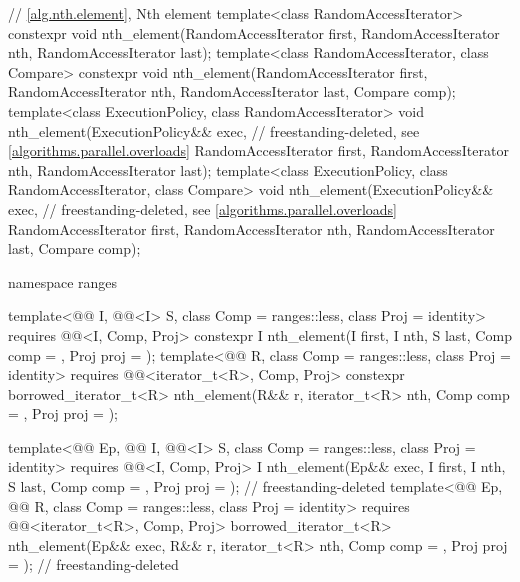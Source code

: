 \begin{codeblock}
{  // \ref{alg.nth.element}, Nth element
  template<class RandomAccessIterator>
    constexpr void nth_element(RandomAccessIterator first, RandomAccessIterator nth,
                               RandomAccessIterator last);
  template<class RandomAccessIterator, class Compare>
    constexpr void nth_element(RandomAccessIterator first, RandomAccessIterator nth,
                               RandomAccessIterator last, Compare comp);
  template<class ExecutionPolicy, class RandomAccessIterator>
    void nth_element(ExecutionPolicy&& exec,                    // freestanding-deleted, see \ref{algorithms.parallel.overloads}
                     RandomAccessIterator first, RandomAccessIterator nth,
                     RandomAccessIterator last);
  template<class ExecutionPolicy, class RandomAccessIterator, class Compare>
    void nth_element(ExecutionPolicy&& exec,                    // freestanding-deleted, see \ref{algorithms.parallel.overloads}
                     RandomAccessIterator first, RandomAccessIterator nth,
                     RandomAccessIterator last, Compare comp);

  namespace ranges {
    template<@@ I, @@<I> S, class Comp = ranges::less,
             class Proj = identity>
      requires @@<I, Comp, Proj>
      constexpr I
        nth_element(I first, I nth, S last, Comp comp = {}, Proj proj = {});
    template<@@ R, class Comp = ranges::less, class Proj = identity>
      requires @@<iterator_t<R>, Comp, Proj>
      constexpr borrowed_iterator_t<R>
        nth_element(R&& r, iterator_t<R> nth, Comp comp = {}, Proj proj = {});

    template<@@ Ep, @@ I, @@<I> S,
             class Comp = ranges::less, class Proj = identity>
      requires @@<I, Comp, Proj>
      I nth_element(Ep&& exec, I first, I nth, S last, Comp comp = {},
                    Proj proj = {});                            // freestanding-deleted
    template<@@ Ep, @@ R, class Comp = ranges::less,
             class Proj = identity>
      requires @@<iterator_t<R>, Comp, Proj>
      borrowed_iterator_t<R>
        nth_element(Ep&& exec, R&& r, iterator_t<R> nth, Comp comp = {},
                    Proj proj = {});                            // freestanding-deleted
  }

}
\end{codeblock}
